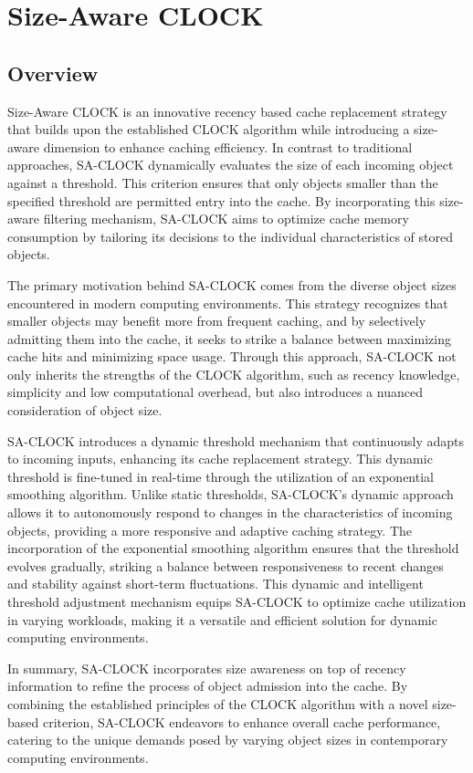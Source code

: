 \documentclass[journal,10.5pt,onecolumn]{IEEEtran}
\begin{document}
\section{Size-Aware CLOCK}
\subsection{Overview}
Size-Aware CLOCK is an innovative recency based cache replacement strategy that builds upon the established CLOCK algorithm while introducing a size-aware dimension to enhance caching efficiency. In contrast to traditional approaches, SA-CLOCK dynamically evaluates the size of each incoming object against a threshold. This criterion ensures that only objects smaller than the specified threshold are permitted entry into the cache. By incorporating this size-aware filtering mechanism, SA-CLOCK aims to optimize cache memory consumption by tailoring its decisions to the individual characteristics of stored objects.

The primary motivation behind SA-CLOCK comes from the diverse object sizes encountered in modern computing environments. This strategy recognizes that smaller objects may benefit more from frequent caching, and by selectively admitting them into the cache, it seeks to strike a balance between maximizing cache hits and minimizing space usage. Through this approach, SA-CLOCK not only inherits the strengths of the CLOCK algorithm, such as recency knowledge, simplicity and low computational overhead, but also introduces a nuanced consideration of object size.

SA-CLOCK introduces a dynamic threshold mechanism that continuously adapts to incoming inputs, enhancing its cache replacement strategy. This dynamic threshold is fine-tuned in real-time through the utilization of an exponential smoothing algorithm. Unlike static thresholds, SA-CLOCK's dynamic approach allows it to autonomously respond to changes in the characteristics of incoming objects, providing a more responsive and adaptive caching strategy. The incorporation of the exponential smoothing algorithm ensures that the threshold evolves gradually, striking a balance between responsiveness to recent changes and stability against short-term fluctuations. This dynamic and intelligent threshold adjustment mechanism equips SA-CLOCK to optimize cache utilization in varying workloads, making it a versatile and efficient solution for dynamic computing environments.

In summary, SA-CLOCK incorporates size awareness on top of recency information to refine the process of object admission into the cache. By combining the established principles of the CLOCK algorithm with a novel size-based criterion, SA-CLOCK endeavors to enhance overall cache performance, catering to the unique demands posed by varying object sizes in contemporary computing environments.
\end{document}
